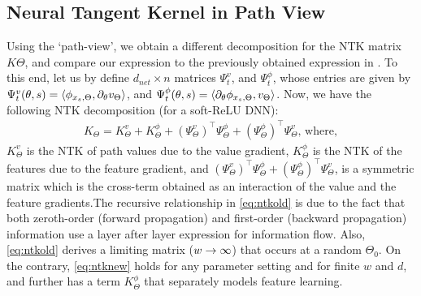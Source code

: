 \subsection{Neural Tangent Kernel in Path View}
Using the `path-view', we obtain a different decomposition for the NTK matrix $K{\Theta}$, and compare our expression to the previously obtained expression in . To this end, let us by define $d_{net}\times n$ matrices $\Psi^v_t$, and $\Psi^{\phi}_t$, whose entries are given by $\Psi^v_t(\theta,s)=\langle \phi_{x_s,\Theta},\partial_{\theta}v_{\Theta}\rangle$, and  $\Psi^{\phi}_t(\theta,s)=\langle \partial_{\theta}\phi_{x_s,\Theta}, v_{\Theta}\rangle$. Now, we have the following NTK decomposition (for a soft-ReLU DNN):
\begin{align}\label{eq:ntknew}
K_{\Theta}=K^v_{\Theta}+K^{\phi}_{\Theta}+(\Psi^v_\Theta)^\top \Psi^{\phi}_{\Theta} +(\Psi^{\phi}_\Theta)^\top \Psi^{v}_{\Theta},\,\text{where},
\end{align}
$K^v_{\Theta}$ is the NTK of path values due to the value gradient, $K^{\phi}_{\Theta}$ is the NTK of the features due to the feature gradient, and $(\Psi^v_\Theta)^\top \Psi^{\phi}_{\Theta} +(\Psi^{\phi}_\Theta)^\top \Psi^{v}_{\Theta}$, is a symmetric matrix which is the cross-term obtained as an interaction of the value and the feature gradients.The recursive relationship in \eqref{eq:ntkold} is due to the fact that both zeroth-order (forward propagation) and first-order (backward propagation) information use a layer after layer expression for information flow. Also, \eqref{eq:ntkold} derives a limiting matrix ($w\rightarrow\infty$) that occurs at a random $\Theta_0$. On the contrary, \eqref{eq:ntknew} holds for any parameter setting and for finite $w$ and $d$, and further has a term $K^{\phi}_{\Theta}$ that separately models feature learning.
\begin{comment}$\bullet$ \textbf{Role of Active Sub-Network:} Input Gram matrix and 
\begin{theorem}[\citet{ando}]\label{th:ando}
For two Hermitian matrices $A\in \C^{d\times d}$ and $B\in \C^{d\times d}$, $\lambda_{\min}(A\odot\B)\geq \lambda_{\min} (AB)$. 
\end{theorem}
\begin{lemma}\label{lm:suf}
For two positive definite symmetric matrices $A$ and $B$, $\lambda_{\min}(AB)\geq \lambda_{\min} (A)\lambda_{\min}(B)$. 
\end{lemma}
From \Cref{lm:suf}, a sufficient condition to ensue that $\rho_{\min}(H_{\Theta})$ is bounded away from zero is to ensure that $\rho_{\min}(\Lambda_{\Theta})$ and $\rho_{\min}(\Sigma)$ bounded away from $0$.\\
\end{comment}

